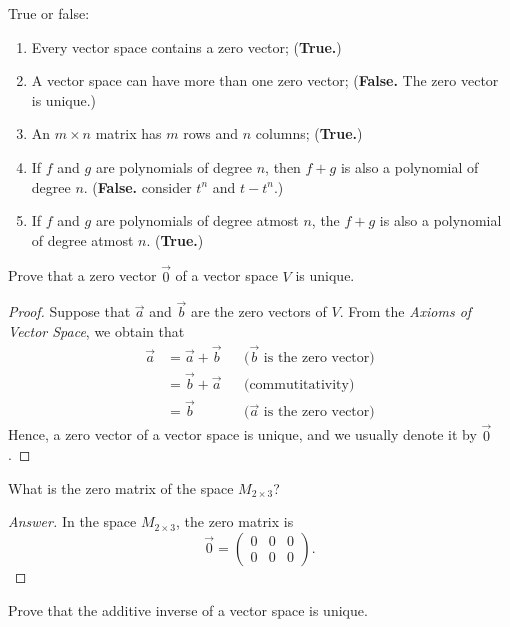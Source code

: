 \documentclass{article}
\begin{document}
\begin{exercise}
  True or false:
  \begin{enumerate}
    \item Every vector space contains a zero vector;
      (\textbf{True.})
    \item A vector space can have more than one zero vector;
      (\textbf{False.} The zero vector is unique.)
    \item An $m\times n$ matrix has $m$ rows and $n$ columns;
      (\textbf{True.})
    \item If $f$ and $g$ are polynomials of degree $n$, then $f+g$
      is also a polynomial of degree $n$.
      (\textbf{False.} consider $t^n$ and $t-t^n$.)
    \item If $f$ and $g$ are polynomials of degree atmost $n$, the $f+g$
      is also a polynomial of degree atmost $n$.
      (\textbf{True.})
  \end{enumerate}
\end{exercise}
\begin{exercise}
  Prove that a zero vector $\vec{0}$ of a vector space $V$ is
  unique.
\end{exercise}
\begin{proof}
  Suppose that $\vec{a}$ and $\vec{b}$ are the zero vectors of $V$.
  From the \emph{Axioms of Vector Space}, we obtain that
  \begin{align*}
    \vec{a}
      &=\vec{a}+\vec{b} && \text{($\vec{b}$ is the zero vector)}\\
      &=\vec{b}+\vec{a} && \text{(commutitativity)}\\
      &=\vec{b}         && \text{($\vec{a}$ is the zero vector)}
  \end{align*}
  Hence, a zero vector of a vector space is unique,
  and we usually denote it by $\vec{0}$.
\end{proof}
\begin{exercise}
  What is the zero matrix of the space $M_{2\times 3}$?
\end{exercise}
\begin{proof}[Answer]
  In the space $M_{2\times 3}$, the zero matrix is 
  \[
    \vec{0}=
    \begin{pmatrix}
      0&0&0\\
      0&0&0
    \end{pmatrix}.
  \]
\end{proof}
\begin{exercise}
  Prove that the additive inverse of a vector space is unique.
\end{exercise}
\end{document}
